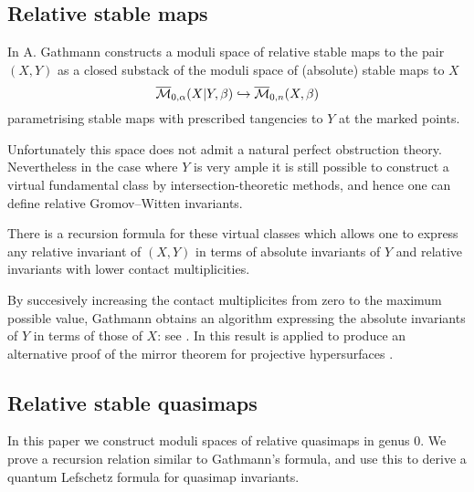 
\subsection{Relative stable maps}
In \cite{Ga} A. Gathmann constructs a moduli space of relative stable maps to the pair $(X,Y)$ as a closed substack of the moduli space of (absolute) stable maps to $X$
\begin{equation*} \overline{\mathcal M}_{0,\alpha}(X|Y,\beta) \hookrightarrow \overline{\mathcal M}_{0,n}(X,\beta) \end{equation*}
parametrising stable maps with prescribed tangencies to $Y$ at the marked points.

Unfortunately this space does not admit a natural perfect obstruction theory. Nevertheless in the case where $Y$ is very ample it is still possible to construct a virtual fundamental class by intersection-theoretic methods, and hence one can define relative Gromov--Witten invariants.

There is a recursion formula for these virtual classes which allows one to express any relative invariant of $(X,Y)$ in terms of absolute invariants of $Y$ and relative invariants with lower contact multiplicities. 


By succesively increasing the contact multiplicites from zero to the maximum possible value, Gathmann obtains an algorithm expressing the absolute invariants of $Y$ in terms of those of $X$: see \cite[Corollary 5.7]{Ga}. In \cite{Ga-MF} this result is applied to produce an alternative proof of the mirror theorem for projective hypersurfaces \cite{Giv} \cite{LLY}.

\subsection{Relative stable quasimaps}
In this paper we construct moduli spaces of relative quasimaps in genus $0$. We prove a recursion relation similar to Gathmann's formula, and use this to derive a quantum Lefschetz formula for quasimap invariants.


